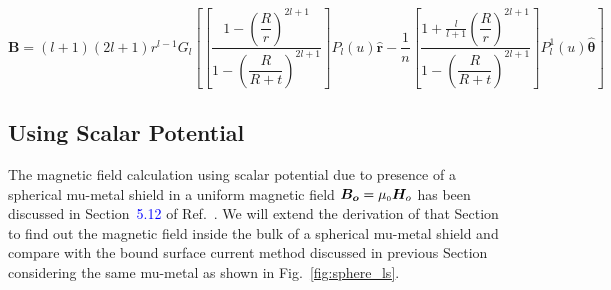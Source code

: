 

$$\bm B= (l+1)(2l+1)r^{l-1}G_l\left[\left[\frac{1-\left(\dfrac{R}{r}\right)^{2l+1}}{1-\left(\dfrac{R}{R+t}\right)^{2l+1}}\right] P_l(u) \bm{\hat{r}} -\frac{1}{n}\left[\frac{1+\frac{l}{l+1}\left(\dfrac{R}{r}\right)^{2l+1}}{1-\left(\dfrac{R}{R+t}\right)^{2l+1}}\right] P_l^1(u) \bm{\hat{\theta}}\right]$$



\subsection{Using Scalar Potential}
The magnetic field calculation using scalar potential due to presence of a spherical mu-metal shield in a uniform magnetic field \(\bm{B_o}= \mu_{\scriptscriptstyle 0} \bm H_o\) has been discussed in Section~\textcolor{blue}{5.12} of Ref.~\cite{jackson}. We will extend the derivation of that Section to find out the magnetic field inside the bulk of a spherical mu-metal shield and compare with the bound surface current method discussed in previous Section considering the same mu-metal as shown in Fig.~\ref{fig:sphere_ls}.

